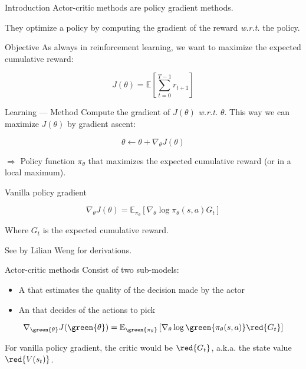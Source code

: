 \begin{frame}{Introduction}
  Actor-critic methods are policy gradient methods.

  They optimize a policy by computing the gradient of the reward \textit{w.r.t.} the policy.
\end{frame}

\begin{frame}{Objective}
  As always in reinforcement learning, we want to maximize the expected cumulative reward:

  \[
    J(\theta) = \mathbb{E}\left[\sum_{t=0}^{T-1}r_{t + 1}\right]
  \]
\end{frame}

\begin{frame}{Learning --- Method}
  Compute the gradient of $J(\theta)$ \emph{w.r.t.} $\theta$. This way we can maximize $J(\theta)$ by gradient ascent:

  \[
    \theta \leftarrow \theta + \nabla_\theta J(\theta)
  \]

  $\Rightarrow$ Policy function $\pi_\theta$ that maximizes the expected cumulative reward (or in a local maximum).
\end{frame}

\begin{frame}{Vanilla policy gradient}

  \[
    \nabla_\theta J(\theta) = \mathbb{E}_{\pi_\theta} \left[\nabla_\theta \log \pi_\theta(s, a)G_t\right]
  \]

  Where $G_t$ is the expected cumulative reward.

  See  by Lilian Weng for derivations.
\end{frame}

\begin{frame}{Actor-critic methods}
  Consist of two sub-models:

  \begin{itemize}
    \item A  that estimates the quality of the decision made by the actor
    \item An  that decides of the actions to pick
  \end{itemize}

  \[
    \nabla_{\green{\theta}} J(\green{\theta}) = \mathbb{E}_{\green{\pi_\theta}} \left[\nabla_\theta \log \green{\pi_\theta(s, a)}\red{G_t}\right]
  \]

  For vanilla policy gradient, the critic would be $\red{G_t}$, a.k.a. the state value $\red{V(s_t)}$.
\end{frame}

